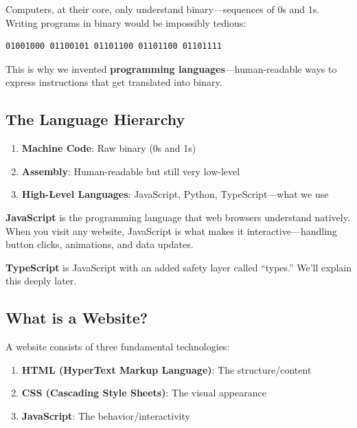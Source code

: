 \documentclass[12pt,a4paper]{article}
\begin{document}
Computers, at their core, only understand binary---sequences of 0s and 1s. Writing programs in binary would be impossibly tedious:

\begin{lstlisting}[language={},caption={Binary code (what computers actually understand)}]
01001000 01100101 01101100 01101100 01101111
\end{lstlisting}

This is why we invented \textbf{programming languages}---human-readable ways to express instructions that get translated into binary.

\subsection{The Language Hierarchy}

\begin{enumerate}
    \item \textbf{Machine Code}: Raw binary (0s and 1s)
    \item \textbf{Assembly}: Human-readable but still very low-level
    \item \textbf{High-Level Languages}: JavaScript, Python, TypeScript---what we use
\end{enumerate}

\begin{concept}
\textbf{JavaScript} is the programming language that web browsers understand natively. When you visit any website, JavaScript is what makes it interactive---handling button clicks, animations, and data updates.

\textbf{TypeScript} is JavaScript with an added safety layer called ``types.'' We'll explain this deeply later.
\end{concept}

\subsection{What is a Website?}

A website consists of three fundamental technologies:

\begin{enumerate}
    \item \textbf{HTML (HyperText Markup Language)}: The structure/content
    \item \textbf{CSS (Cascading Style Sheets)}: The visual appearance
    \item \textbf{JavaScript}: The behavior/interactivity
\end{enumerate}
\end{document}
